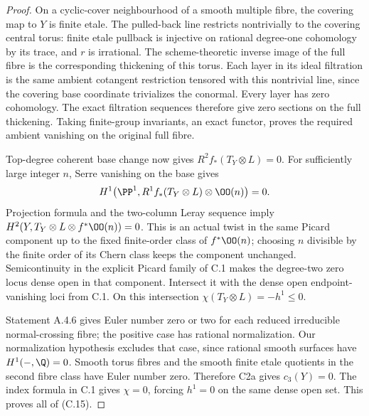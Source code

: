 \begin{proof}
On a cyclic-cover neighbourhood of a smooth multiple fibre, the covering map to $Y$ is finite etale. The pulled-back line restricts nontrivially to the covering central torus: finite etale pullback is injective on rational degree-one cohomology by its trace, and $r$ is irrational. The scheme-theoretic inverse image of the full fibre is the corresponding thickening of this torus. Each layer in its ideal filtration is the same ambient cotangent restriction tensored with this nontrivial line, since the covering base coordinate trivializes the conormal. Every layer has zero cohomology. The exact filtration sequences therefore give zero sections on the full thickening. Taking finite-group invariants, an exact functor, proves the required ambient vanishing on the original full fibre.

Top-degree coherent base change now gives $R^2f_*(T_Y\otimes L)=0$. For sufficiently large integer $n$, Serre vanishing on the base gives
\[
H^1\bigl(\PP^1,R^1f_*(T_Y\otimes L)\otimes\OO(n)\bigr)=0.
\]
Projection formula and the two-column Leray sequence imply
$H^2(Y,T_Y\otimes L\otimes f^*\OO(n))=0$.
This is an actual twist in the same Picard component up to the fixed finite-order class of $f^*\OO(n)$; choosing $n$ divisible by the finite order of its Chern class keeps the component unchanged. Semicontinuity in the explicit Picard family of C.1 makes the degree-two zero locus dense open in that component. Intersect it with the dense open endpoint-vanishing loci from C.1. On this intersection $\chi(T_Y\otimes L)=-h^1\le0$.

Statement A.4.6 gives Euler number zero or two for each reduced irreducible normal-crossing fibre; the positive case has rational normalization. Our normalization hypothesis excludes that case, since rational smooth surfaces have $H^1(-,\Q)=0$. Smooth torus fibres and the smooth finite etale quotients in the second fibre class have Euler number zero. Therefore C2a gives $c_3(Y)=0$. The index formula in C.1 gives $\chi=0$, forcing $h^1=0$ on the same dense open set. This proves all of (C.15).
\end{proof}



